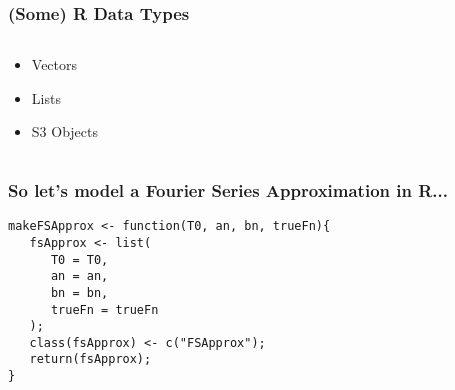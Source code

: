 \documentclass{beamer}
\begin{document}
\begin{frame}
   \frametitle{(Some) R Data Types}
   \begin{columns}
      \begin{column}{5cm}
         \begin{itemize}
            \item \alert<1>{Vectors}
            \item \alert<2>{Lists}
            \item \alert<3>{S3 Objects}
         \end{itemize}
      \end{column}
      \begin{column}{5cm}
      \end{column}
   \end{columns}
\end{frame}

\begin{frame}[fragile]
   \frametitle{So let's model a Fourier Series Approximation in R...}
   \begin{center}
   \begin{minipage}{100mm}
   \begin{lstlisting}
makeFSApprox <- function(T0, an, bn, trueFn){
   fsApprox <- list(
      T0 = T0,
      an = an,
      bn = bn,
      trueFn = trueFn
   );
   class(fsApprox) <- c("FSApprox");
   return(fsApprox);
}
   \end{lstlisting}
   \end{minipage}
   \end{center}
\end{frame}
\end{document}
